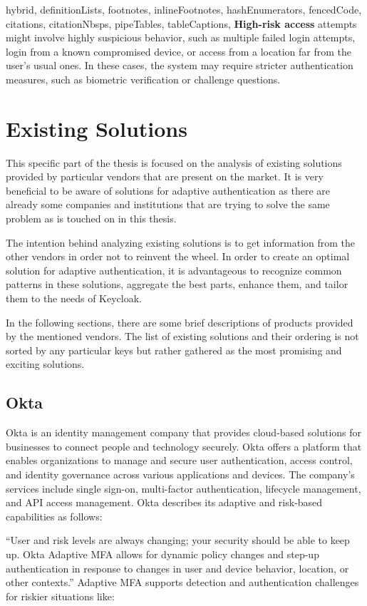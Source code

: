 \documentclass[
  digital,     %
  oneside,     %
  nosansbold,  %
  nocolorbold, %
  lof,         %
  lot,         %
]{fithesis4}
\begin{document}
\begin{markdown*}{%
  hybrid,
  definitionLists,
  footnotes,
  inlineFootnotes,
  hashEnumerators,
  fencedCode,
  citations,
  citationNbsps,
  pipeTables,
  tableCaptions,
}
\textbf{High-risk access} attempts might involve highly suspicious behavior, such as multiple failed login attempts, login from a known compromised device, or access from a location far from the user's usual ones.
In these cases, the system may require stricter authentication measures, such as biometric verification or challenge questions.

\shorthandon{-}

\chapter{Existing Solutions}

This specific part of the thesis is focused on the analysis of existing solutions provided by particular vendors that are present on the market.
It is very beneficial to be aware of solutions for adaptive authentication as there are already some companies and institutions that are trying to solve the same problem as is touched on in this thesis.

The intention behind analyzing existing solutions is to get information from the other vendors in order not to reinvent the wheel.
In order to create an optimal solution for adaptive authentication, it is advantageous to recognize common patterns in these solutions, aggregate the best parts, enhance them, and tailor them to the needs of Keycloak. 

In the following sections, there are some brief descriptions of products provided by the mentioned vendors.
The list of existing solutions and their ordering is not sorted by any particular keys but rather gathered as the most promising and exciting solutions.

\newpage
\section{Okta}

Okta is an identity management company that provides cloud-based solutions for businesses to connect people and technology securely.
Okta offers a platform that enables organizations to manage and secure user authentication, access control, and identity governance across various applications and devices.
The company's services include single sign-on, multi-factor authentication, lifecycle management, and API access management.
Okta describes its adaptive and risk-based capabilities as follows:

``User and risk levels are always changing; your security should be able to keep up.
Okta Adaptive MFA allows for dynamic policy changes and step-up authentication in response to changes in user and device behavior, location, or other contexts.''\cite{existing-okta}
\newline
\newline
Adaptive MFA supports detection and authentication challenges for riskier situations like:


\end{markdown*}
\end{document}
